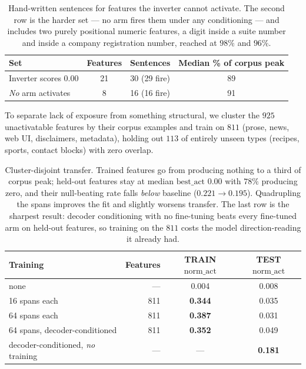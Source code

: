 \begin{table}[htbp]
\centering
\begin{tabular}{lccc}
\toprule
Set & Features & Sentences & Median \% of corpus peak \\
\midrule
Inverter scores 0.00       & 21 & 30 (29 fire) & 89 \\
\emph{No} arm activates    &  8 & 16 (16 fire) & 91 \\
\bottomrule
\end{tabular}
\caption{Hand-written sentences for features the inverter cannot activate. The second row is the
harder set --- no arm fires them under any conditioning --- and includes two purely positional
numeric features, a digit inside a suite number and inside a company registration number, reached at
$98\%$ and $96\%$.}
\label{tab:verb-human}
\end{table}

To separate lack of exposure from something structural, we cluster the $925$ unactivatable features
by their corpus examples and train on $811$ (prose, news, web UI, disclaimers, metadata), holding out
$113$ of entirely unseen types (recipes, sports, contact blocks) with zero overlap.

\begin{table}[htbp]
\centering
\begin{tabular}{lrcc}
\toprule
Training & Features & TRAIN $\mathrm{norm\_act}$ & TEST $\mathrm{norm\_act}$ \\
\midrule
none                          & --- & 0.004 & 0.008 \\
16 spans each                 & 811 & \textbf{0.344} & 0.035 \\
64 spans each                 & 811 & \textbf{0.387} & 0.031 \\
64 spans, decoder-conditioned & 811 & \textbf{0.352} & 0.049 \\
\midrule
decoder-conditioned, \emph{no} training & --- & --- & \textbf{0.181} \\
\bottomrule
\end{tabular}
\caption{Cluster-disjoint transfer. Trained features go from producing nothing to a third of corpus
peak; held-out features stay at median $\mathrm{best\_act}$ $0.00$ with $78\%$ producing zero, and
their null-beating rate falls \emph{below} baseline ($0.221 \rightarrow 0.195$). Quadrupling the
spans improves the fit and slightly worsens transfer. The last row is the sharpest result: decoder
conditioning with no fine-tuning beats every fine-tuned arm on held-out features, so training on the
$811$ costs the model direction-reading it already had.}
\label{tab:verb-transfer}
\end{table}

